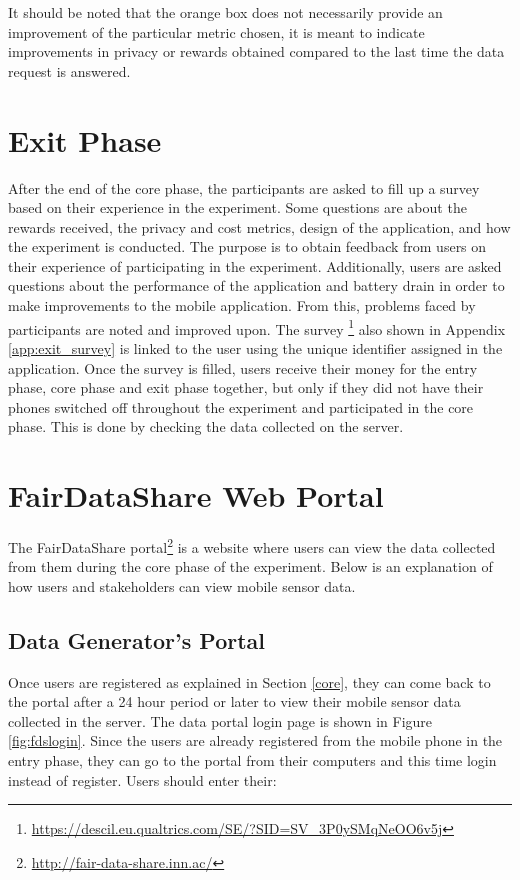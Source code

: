 It should be noted that the orange box does not necessarily provide an improvement of the particular metric chosen, it is meant to indicate improvements in privacy or rewards obtained compared to the last time the data request is answered.


\section{Exit Phase}

After the end of the core phase, the participants are asked to fill up a survey based on their experience in the experiment. Some questions are
about the rewards received, the privacy and cost metrics, design of the application, and how the experiment is conducted. The purpose is to obtain feedback from users on their experience of participating in the experiment. Additionally, users are asked questions about the performance of the application and battery drain in order to make improvements to the mobile application. From this, problems faced by participants are noted and improved upon. The survey \footnote{\url{https://descil.eu.qualtrics.com/SE/?SID=SV_3P0ySMqNeOO6v5j}} also shown in Appendix \ref{app:exit_survey} is linked to the user using the unique identifier assigned in the application. Once the survey is filled, users receive their money for the entry phase, core phase and exit phase together, but only if they did not have their phones switched off throughout the experiment and participated in the core phase. This is done by checking the data collected on the server. 

\section{FairDataShare Web Portal} \label{fds}

The FairDataShare portal\footnote{\url{http://fair-data-share.inn.ac/}} is a website where users can view the data collected from them during the core phase of the experiment. Below is an explanation of how users and stakeholders can view mobile sensor data.

\subsection{Data Generator's Portal}

Once users are registered as explained in Section \ref{core}, they can come back to the portal after a 24 hour period or later to view their mobile sensor data collected in the server. The data portal login page is shown in Figure \ref{fig:fdslogin}. Since the users are already registered from the mobile phone in the entry phase, they can go to the portal from their computers and this time login instead of register. Users should enter their: 

